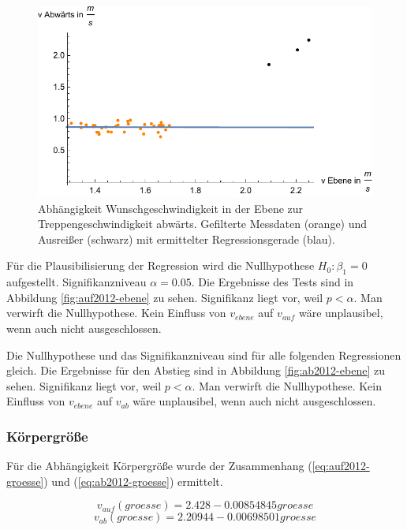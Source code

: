 \begin{figure} \centering 
	\includegraphics[]{abbildungen/regression/2012/ohneausreisser/ab-ebene.pdf}
	
	\caption{Abhängigkeit Wunschgeschwindigkeit in der Ebene zur Treppengeschwindigkeit abwärts. Gefilterte Messdaten (orange) und Ausreißer (schwarz) mit ermittelter Regressionsgerade (blau).
	\label{fig:ohne-ab-ebene}}
\end{figure}

Für die Plausibilisierung der Regression wird die Nullhypothese 
$H_0: \beta_1 = 0$ aufgestellt. Signifikanzniveau $\alpha = 0.05$.
Die Ergebnisse des Tests sind in Abbildung \ref{fig:auf2012-ebene} zu sehen.
Signifikanz liegt vor, weil $p < \alpha$. Man verwirft die
Nullhypothese. Kein Einfluss von $v_{ebene}$ auf $v_{auf}$ wäre unplausibel, wenn auch nicht ausgeschlossen.

Die Nullhypothese und das Signifikanzniveau sind für alle folgenden Regressionen gleich. Die Ergebnisse für den Abstieg sind in Abbildung \ref{fig:ab2012-ebene} zu sehen.
Signifikanz liegt vor, weil $p < \alpha$. Man verwirft die
Nullhypothese. Kein Einfluss von $v_{ebene}$ auf $v_{ab}$ wäre unplausibel, wenn auch nicht ausgeschlossen.

\subsubsection{Körpergröße}

Für die Abhängigkeit Körpergröße wurde 
der Zusammenhang (\ref{eq:auf2012-groesse}) und (\ref{eq:ab2012-groesse}) ermittelt.

\begin{equation} \label{eq:auf2012-groesse}
	v_{auf}(groesse) = 2.428 - 0.00854845 groesse
\end{equation}
\begin{equation} \label{eq:ab2012-groesse}
	v_{ab}(groesse) = 2.20944 - 0.00698501 groesse
\end{equation}

